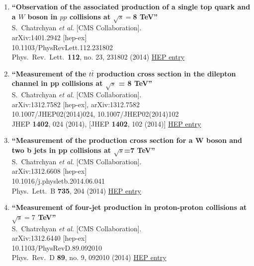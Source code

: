 \documentclass{article}
\begin{document}
\begin{enumerate}
\item%
{\bf ``Observation of the associated production of a single top quark and a $W$ boson in $pp$ collisions at $\sqrt s = $8 TeV''}
  \\{}S.~Chatrchyan {\it et al.} [CMS Collaboration].
  \\{}arXiv:1401.2942 [hep-ex]
    \\{}10.1103/PhysRevLett.112.231802
\\{}Phys.\ Rev.\ Lett.\  {\bf 112}, no. 23, 231802 (2014) %
\href{http://inspirehep.net/record/1276827}{HEP entry}


\item%
{\bf ``Measurement of the $t \bar{t}$ production cross section in the dilepton channel in pp collisions at $\sqrt{s}$ = 8 TeV''}
  \\{}S.~Chatrchyan {\it et al.} [CMS Collaboration].
  \\{}arXiv:1312.7582 [hep-ex], arXiv:1312.7582
    \\{}10.1007/JHEP02(2014)024, 10.1007/JHEP02(2014)102
\\{}JHEP {\bf 1402}, 024 (2014), [JHEP {\bf 1402}, 102 (2014)] %
\href{http://inspirehep.net/record/1275617}{HEP entry}


\item%
{\bf ``Measurement of the production cross section for a W boson and two b jets in pp collisions at $\sqrt{s}$=7 TeV''}
  \\{}S.~Chatrchyan {\it et al.} [CMS Collaboration].
  \\{}arXiv:1312.6608 [hep-ex]
    \\{}10.1016/j.physletb.2014.06.041
\\{}Phys.\ Lett.\ B {\bf 735}, 204 (2014) %
\href{http://inspirehep.net/record/1273578}{HEP entry}


\item%
{\bf ``Measurement of four-jet production in proton-proton collisions at $\sqrt{s}=7$  TeV''}
  \\{}S.~Chatrchyan {\it et al.} [CMS Collaboration].
  \\{}arXiv:1312.6440 [hep-ex]
    \\{}10.1103/PhysRevD.89.092010
\\{}Phys.\ Rev.\ D {\bf 89}, no. 9, 092010 (2014) %
\href{http://inspirehep.net/record/1273574}{HEP entry}



\end{enumerate}
\end{document}
